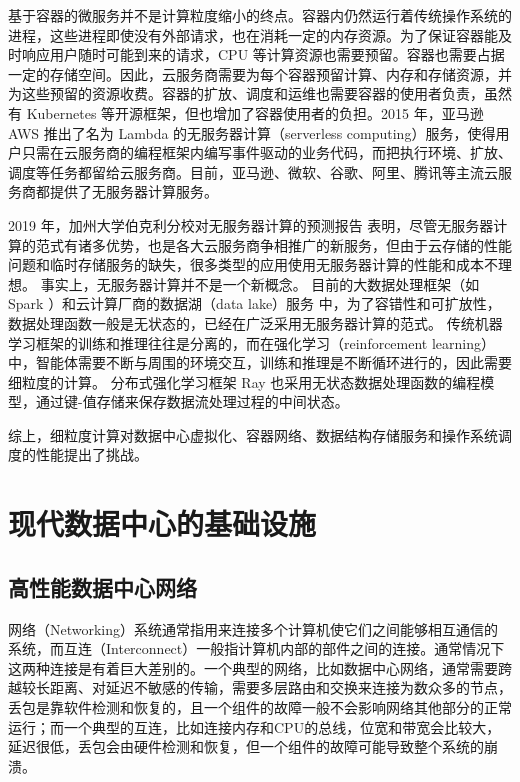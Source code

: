 基于容器的微服务并不是计算粒度缩小的终点。容器内仍然运行着传统操作系统的进程，这些进程即使没有外部请求，也在消耗一定的内存资源。为了保证容器能及时响应用户随时可能到来的请求，CPU 等计算资源也需要预留。容器也需要占据一定的存储空间。因此，云服务商需要为每个容器预留计算、内存和存储资源，并为这些预留的资源收费。容器的扩放、调度和运维也需要容器的使用者负责，虽然有 Kubernetes \cite{burns2016borg} 等开源框架，但也增加了容器使用者的负担。2015 年，亚马逊 AWS 推出了名为 Lambda 的无服务器计算（serverless computing）服务，使得用户只需在云服务商的编程框架内编写事件驱动的业务代码，而把执行环境、扩放、调度等任务都留给云服务商。目前，亚马逊、微软、谷歌、阿里、腾讯等主流云服务商都提供了无服务器计算服务。

2019 年，加州大学伯克利分校对无服务器计算的预测报告 \cite{jonas2019cloud} 表明，尽管无服务器计算的范式有诸多优势，也是各大云服务商争相推广的新服务，但由于云存储的性能问题和临时存储服务的缺失，很多类型的应用使用无服务器计算的性能和成本不理想。
事实上，无服务器计算并不是一个新概念。
目前的大数据处理框架（如 Spark \cite{zaharia2010spark}）和云计算厂商的数据湖（data lake）服务 \cite{ramakrishnan2017azure} 中，为了容错性和可扩放性，数据处理函数一般是无状态的，已经在广泛采用无服务器计算的范式。
传统机器学习框架的训练和推理往往是分离的，而在强化学习（reinforcement learning）中，智能体需要不断与周围的环境交互，训练和推理是不断循环进行的，因此需要细粒度的计算。
分布式强化学习框架 Ray \cite{moritz2018ray} 也采用无状态数据处理函数的编程模型，通过键-值存储来保存数据流处理过程的中间状态。

综上，细粒度计算对数据中心虚拟化、容器网络、数据结构存储服务和操作系统调度的性能提出了挑战。


\iffalse
\section{现代数据中心的基础设施}

\subsection{高性能数据中心网络}

网络（Networking）系统通常指用来连接多个计算机使它们之间能够相互通信的系统，而互连（Interconnect）一般指计算机内部的部件之间的连接。通常情况下这两种连接是有着巨大差别的。一个典型的网络，比如数据中心网络，通常需要跨越较长距离、对延迟不敏感的传输，需要多层路由和交换来连接为数众多的节点，丢包是靠软件检测和恢复的，且一个组件的故障一般不会影响网络其他部分的正常运行；而一个典型的互连，比如连接内存和CPU的总线，位宽和带宽会比较大，延迟很低，丢包会由硬件检测和恢复，但一个组件的故障可能导致整个系统的崩溃。

